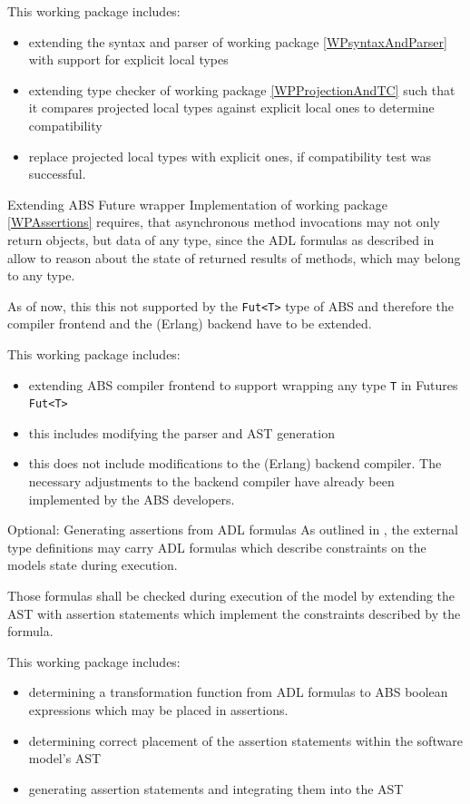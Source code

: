 \documentclass[paper=a4,nochapname,accentcolor=tud9c]{tudexercise}
\makeatletter
\def\namedlabel#1#2{\begingroup
    #1%
    \def\@currentlabel{\thedescriptcount}%
    \phantomsection\label{#2}\endgroup
}
\newcounter{descriptcount}
\renewcommand*\thedescriptcount{[\Alph{descriptcount}]}}
\renewcommand*\thedescriptcount{\roman{descriptcount}}}
\makeatother
\begin{document}
\begin{enumdescript}
    This working package includes:
    \begin{itemize}
      \item extending the syntax and parser of working package \ref{WPsyntaxAndParser}
        with support for explicit local types
      \item extending type checker of working package \ref{WPProjectionAndTC} such
        that it compares projected local types against explicit local ones to
        determine compatibility
      \item replace projected local types with explicit ones, if compatibility
        test was successful.
    \end{itemize}
  \item[\namedlabel{Extending ABS Future wrapper}{WPAnyFut}]%
    Implementation of working package \ref{WPAssertions} requires, that asynchronous method
    invocations may not only return objects, but data of any type, since the ADL
    formulas as described in \cite{kamburjan2018stateful} allow to reason about the state of returned results of methods, which may belong to any type.

    As of now, this this not supported by the \texttt{Fut<T>} type of ABS and
    therefore the compiler frontend and the (Erlang) backend have to be extended.

    This working package includes:
    \begin{itemize}
      \item extending ABS compiler frontend to support wrapping any type
        \texttt{T} in Futures \texttt{Fut<T>}
      \item this includes modifying the parser and AST generation
        \item this does not include modifications to the (Erlang) backend
          compiler. The necessary adjustments to the backend compiler have
          already been implemented by the ABS developers. %
    \end{itemize}
  \item[\namedlabel{Optional: Generating assertions from ADL formulas}{WPAssertions}]%
    As outlined in \cite{kamburjan2018stateful}, the external type definitions
    may carry ADL formulas which describe constraints on the models state during 
    execution.

    Those formulas shall be checked during execution of the model by extending
    the AST with assertion statements \cite{absassertions} which implement the
    constraints described by the formula.

    This working package includes:
    \begin{itemize}
      \item determining a transformation function from ADL formulas to ABS
        boolean expressions which may be placed in assertions.
      \item determining correct placement of the assertion statements within
        the software model's AST
      \item generating assertion statements and integrating them into the AST
    \end{itemize}
\end{enumdescript}
\end{document}
